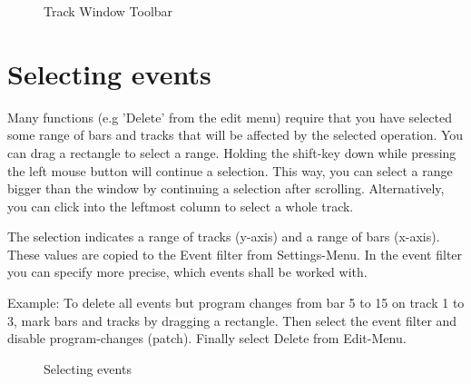 \documentclass[letterpaper]{report}
\begin{document}
\begin{figure}
\caption{Track Window Toolbar}
\end{figure}

\section{Selecting events}\label{select}

Many functions (e.g 'Delete' from the edit menu) require that you have
selected some range of bars and tracks that will be affected by the
selected operation. You can drag a rectangle to select a range. Holding
the shift-key down while pressing the left mouse button will continue a
selection. This way, you can select a range bigger than the window by
continuing a selection after scrolling. Alternatively, you can click
into the leftmost column to select a whole track.

The selection indicates a range of tracks (y-axis) and a range of bars (x-axis).
These values are copied to the Event filter from Settings-Menu. In the event filter
you can specify more precise, which events shall be worked with.

Example: To delete all events but program changes from bar 5 to 15 on track 1 to 3,
mark bars and tracks by dragging a rectangle. Then select the event filter and
disable program-changes (patch). Finally select Delete from Edit-Menu.

\begin{figure}
\caption{Selecting events}
\end{figure}
\end{document}
